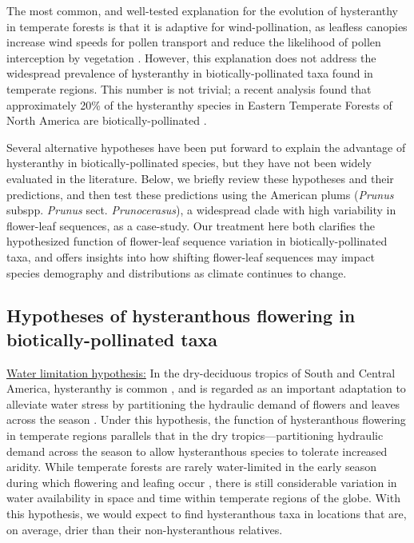 \documentclass{article}[12pt]
\begin{document}
\noindent The most common, and well-tested explanation for the evolution of hysteranthy in temperate forests is that it is adaptive for wind-pollination, as leafless canopies increase wind speeds for pollen transport and reduce the likelihood of pollen interception by vegetation \citep{Whitehead1969,Niklas1985}. However, this explanation does not address the widespread prevalence of hysteranthy in biotically-pollinated taxa found in temperate regions. This number is not trivial; a recent analysis found that approximately 20\% of the hysteranthy species in Eastern Temperate Forests of North America are biotically-pollinated \citep{Buonaiuto2020}. 

Several alternative hypotheses have been put forward to explain the advantage of hysteranthy in biotically-pollinated species, but they have not been widely evaluated in the literature. Below, we briefly review these hypotheses and their predictions, and then test these predictions using the American plums (\textit{Prunus} subspp. \textit{Prunus} sect. \textit{Prunocerasus}), a widespread clade with high variability in flower-leaf sequences, as a case-study. Our treatment here both clarifies the hypothesized function of flower-leaf sequence variation in biotically-pollinated taxa, and offers insights into how shifting flower-leaf sequences may impact species demography and distributions as climate continues to change.

\subsection*{Hypotheses of hysteranthous flowering in biotically-pollinated taxa}

\underline{Water limitation hypothesis:} In the dry-deciduous tropics of South and Central America, hysteranthy is common \citep{Rathcke_1985,Franklin2016}, and is regarded as an important adaptation to alleviate water stress by partitioning the hydraulic demand of flowers and leaves across the season \citep{Gougherty2018,Franklin2016,Borchert1983,Reich1984}. Under this hypothesis, the function of hysteranthous flowering in temperate regions parallels that in the dry tropics---partitioning hydraulic demand across the season to allow hysteranthous species to tolerate increased aridity. While temperate forests are rarely water-limited in the early season during which flowering and leafing occur \citep{Polgar2011}, there is still considerable variation in water availability in space and time within temperate regions of the globe.  With this hypothesis, we would expect to find hysteranthous taxa in locations that are, on average, drier than their non-hysteranthous relatives.
\end{document}

